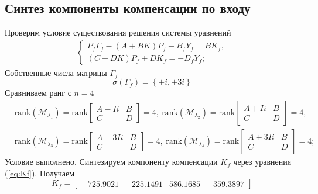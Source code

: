 \documentclass[a4paper, 12pt]{article}
\begin{document}
    \subsection{Синтез компоненты компенсации по входу}
    Проверим условие существования решения системы уравнений
    \begin{align}
        \begin{cases}
            P_f\Gamma_f-\left( A+BK \right)P_f-B_fY_f=BK_f,\\
            \left( C+DK \right)P_f+DK_f=-D_fY_f;
        \end{cases}\label{eq:Kf}
    \end{align}
    Собственные числа матрицы $\Gamma_f$
    $$
    \sigma\left( \Gamma_f \right)=\left\{ \pm i,\pm3i \right\}
    $$
    Сравниваем ранг с $n=4$
    \begin{align*}
    &\text{rank}\left( \mathcal{M}_{\lambda_1} \right)=\text{rank}\begin{bmatrix}
        A-Ii &B\\
        C &D
    \end{bmatrix}=4,\ \text{rank}\left( \mathcal{M}_{\lambda_2} \right)=\text{rank}\begin{bmatrix}
        A+Ii &B\\
        C &D
    \end{bmatrix}=4,\\
    &\text{rank}\left( \mathcal{M}_{\lambda_3} \right)=\text{rank}\begin{bmatrix}
        A-3Ii &B\\
        C &D
    \end{bmatrix}=4,\ \text{rank}\left( \mathcal{M}_{\lambda_4} \right)=\text{rank}\begin{bmatrix}
        A+3Ii &B\\
        C &D
    \end{bmatrix}=4;
    \end{align*}
    Условие выполнено. Синтезируем компоненту компенсации $K_f$ через уравнения (\ref{eq:Kf}).
    Получаем
    $$
    K_f=\begin{bmatrix}
        -725.9021 &-225.1491  &586.1685 &-359.3897
    \end{bmatrix}
    $$
\end{document}
